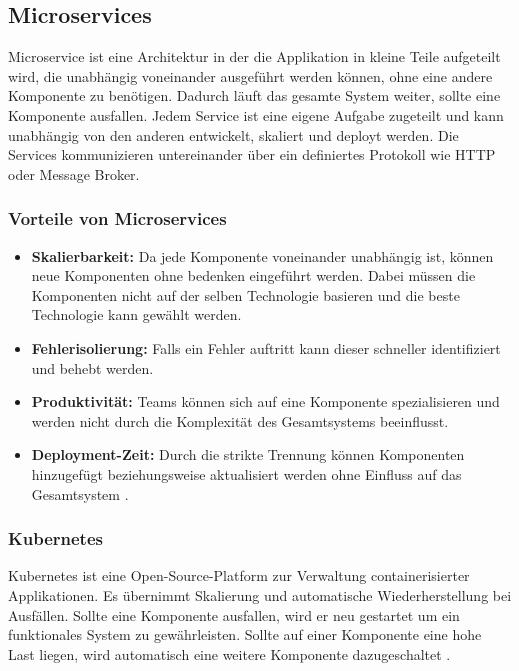 \newpage
\subsection{Microservices}
Microservice ist eine Architektur in der die Applikation in kleine Teile aufgeteilt wird, die unabhängig voneinander ausgeführt werden können, ohne eine andere Komponente zu benötigen. Dadurch läuft das gesamte System weiter, sollte eine Komponente ausfallen.
Jedem Service ist eine eigene Aufgabe zugeteilt und kann unabhängig von den anderen entwickelt, skaliert und deployt werden. Die Services kommunizieren untereinander über ein definiertes Protokoll wie HTTP oder Message Broker. \cite{geeksforgeeks_microservice}

\subsubsection{Vorteile von Microservices}

\begin{itemize}
    \item \textbf{Skalierbarkeit: } Da jede Komponente voneinander unabhängig ist, können neue Komponenten ohne bedenken eingeführt werden. Dabei müssen die Komponenten nicht auf der selben Technologie basieren und die beste Technologie kann gewählt werden. 
    \item \textbf{Fehlerisolierung: } Falls ein Fehler auftritt kann dieser schneller identifiziert und behebt werden.
    \item \textbf{Produktivität: } Teams können sich auf eine Komponente spezialisieren und werden nicht durch die Komplexität des Gesamtsystems beeinflusst. 
    \item \textbf{Deployment-Zeit: } Durch die strikte Trennung können Komponenten hinzugefügt beziehungsweise aktualisiert werden ohne Einfluss auf das Gesamtsystem \cite{atlassian_microservice}.
\end{itemize}

\subsubsection{Kubernetes}
Kubernetes ist eine Open-Source-Platform zur Verwaltung containerisierter Applikationen. Es übernimmt Skalierung und automatische Wiederherstellung bei Ausfällen.
Sollte eine Komponente ausfallen, wird er neu gestartet um ein funktionales System zu gewährleisten. Sollte auf einer Komponente eine hohe Last liegen, wird automatisch eine weitere Komponente dazugeschaltet \cite{kubernetes_overview}.

